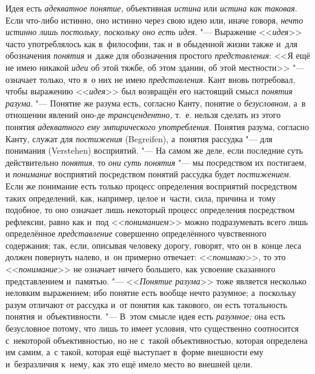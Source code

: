 Идея есть {\em адекватное понятие,} объективная
{\em истина} или
{\em истина как таковая}.
Если что-либо истинно, оно истинно через свою идею или, иначе
говоря, {\em нечто истинно лишь
постольку, поскольку оно есть идея}. "--- Выражение
<<{\em идея}>> часто
употреблялось как в~философии, так и~в обыденной жизни также и~для
обозначения {\em понятия}
и~даже для обозначения простого
{\em представления}: <<Я
ещё не имею никакой {\em идеи}
об этой тяжбе, об этом здании, об этой местности>>
"--- означает только, что я~о них не имею
{\em представления}. Кант
вновь потребовал, чтобы выражению
<<{\em идея}>> был
возвращён его настоящий смысл
{\em понятия разума}.
"--- Понятие же разума есть, согласно Канту, понятие о
{\em безусловном,} а~в
отношении явлений оно-де
{\em трансцендентно,}
т.~е. нельзя сделать из этого понятия
{\em адекватного ему эмпирического
употребления}. Понятия разума, согласно Канту, служат для
{\em постижения} (Begreifen),
а~понятия рассудка "--- для понимания (Verstehen)
восприятий. "--- На самом же деле, если последние суть
действительно {\em понятия,} то {\em они}
{\em суть понятия} "--- мы посредством их постигаем, и {\em понимание}
восприятий посредством понятий рассудка будет {\em постижением}. Если
же понимание есть только процесс определения восприятий посредством таких
определений, как, например, целое и~части, сила, причина и~тому подобное,
то оно означает лишь некоторый процесс определения посредством рефлексии,
равно как и~под <<{\em пониманием}>>
можно подразумевать всего лишь определённое {\em представление}
совершенно определённого чувственного содержания; так, если,
описывая человеку дорогу, говорят, что он в~конце леса должен повернуть
налево, и~он примерно отвечает: <<{\em понимаю}>>, то это
<<{\em понимание}>> не означает ничего большего, как усвоение сказанного
представлением и~памятью. "--- <<{\em Понятие разума}>>
тоже является несколько неловким выражением; ибо понятие есть
вообще нечто разумное; а~поскольку разум отличают от рассудка и~от понятия
как такового, он есть тотальность понятия и~объективности. "---
В~этом смысле идея есть {\em разумное;} она есть
безусловное потому, что лишь то имеет условия, что существенно соотносится
с~некоторой объективностью, но не с~такой объективностью, которая
определена им самим, а~с такой, которая ещё выступает в~форме внешности ему
и~безразличия к~нему, как это ещё имело место во внешней цели.

